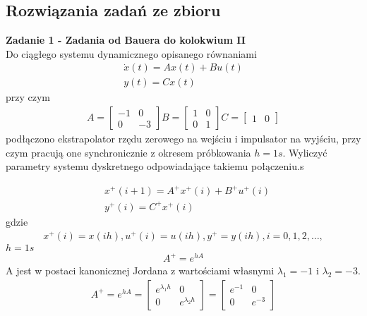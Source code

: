 \documentclass[a4paper,11pt]{article}
\begin{document}
\subsection{Rozwiązania zadań ze zbioru}
\begin{framed}
\textbf{Zadanie 1 - Zadania od Bauera do kolokwium II } \\ 
Do ciągłego systemu dynamicznego opisanego równaniami
\begin{align*}
\dot{x}(t)=Ax(t)+Bu(t) \\
y(t)=Cx(t)
\end{align*}
przy czym 
\begin{align*}
A = 
\begin{bmatrix}
-1 & 0 \\
0 & -3
\end{bmatrix}
B = 
\begin{bmatrix}
1 & 0 \\
0 & 1
\end{bmatrix}
C = 
\begin{bmatrix}
1 & 0
\end{bmatrix}
\end{align*}
podłączono ekstrapolator rzędu zerowego na wejściu i impulsator na wyjściu, przy czym pracują one synchronicznie z okresem próbkowania \( h = 1s \). Wyliczyć parametry systemu dyskretnego odpowiadające takiemu połączeniu.s 
\end{framed}
\begin{align*}
&x^{+}(i+1)=A^{+}x^{+}(i)+B^{+}u^{+}(i) \\
&y^{+}(i)=C^{+}x^{+}(i)
\end{align*}
gdzie 
\begin{align*}
x^{+}(i)=x(ih), u^{+}(i)=u(ih), y^{+}=y(ih), i=0,1,2, \dots ,
\end{align*}
\( h = 1s \)
\begin{align*}
A^{+}=e^{hA}
\end{align*}
A jest w postaci kanonicznej Jordana z wartościami własnymi \( \lambda_{1} = -1 \) i \( \lambda_{2} = -3 \).
\begin{align*}
A^{+}=e^{hA}=
\begin{bmatrix}
e^{\lambda_{1}h} & 0 \\
0 & e^{\lambda_{2}h}
\end{bmatrix}
=
\begin{bmatrix}
e^{-1} & 0 \\
0 & e^{-3}
\end{bmatrix}
\end{align*}
\end{document}
